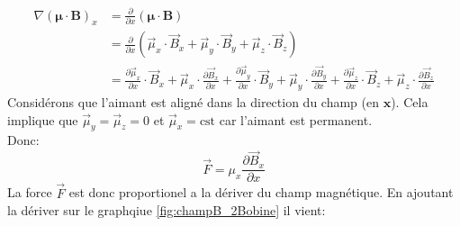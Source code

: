 \documentclass{article}
\begin{document}
    \begin{align*}
        \nabla(\boldsymbol{\mu}\cdot\mathbf{B})_x &= \frac{\partial}{\partial x}(\boldsymbol{\mu}\cdot\mathbf{B}) \\
        &= \frac{\partial}{\partial x}(\vec{\mu}_x \cdot \vec{B}_x + \vec{\mu}_y \cdot \vec{B}_y + \vec{\mu}_z \cdot \vec{B}_z) \\
        &= \frac{\partial\vec{\mu}_x}{\partial x} \cdot \vec{B}_x + \vec{\mu}_x \cdot \frac{\partial\vec{B}_x}{\partial x} + \frac{\partial\vec{\mu}_y}{\partial x} \cdot \vec{B}_y + \vec{\mu}_y \cdot \frac{\partial\vec{B}_y}{\partial x} + \frac{\partial\vec{\mu}_z}{\partial x} \cdot \vec{B}_z + \vec{\mu}_z \cdot \frac{\partial\vec{B}_z}{\partial x}
    \end{align*}
Considérons que l'aimant est aligné dans la direction du champ (en $\mathbf{x}$). Cela implique que $\vec{\mu}_y = \vec{\mu}_z = 0$ et $\vec{\mu}_x = \text{cst}$ car l'aimant est permanent.\\
Donc: 
    \begin{equation}
        \vec{F} = \mu_x \frac{\partial\vec{B}_x}{\partial x}
    \end{equation}
La force $\vec{F}$ est donc proportionel a la dériver du champ magnétique. En ajoutant la dériver sur le graphqiue \ref{fig:champB_2Bobine} il vient:\\\\
 
\end{document}
